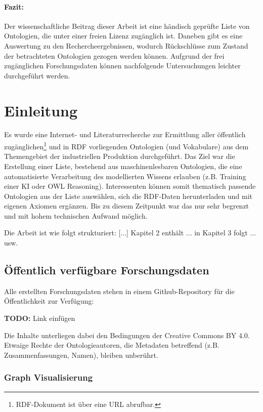 \documentclass{article}
\begin{document}
\paragraph{Fazit:} Der wissenschaftliche Beitrag dieser Arbeit ist eine händisch geprüfte Liste von Ontologien, die unter einer freien Lizenz zugänglich ist. Daneben gibt es eine Auswertung zu den Rechercheergebnissen, wodurch Rückschlüsse zum Zustand der betrachteten Ontologien gezogen werden können. Aufgrund der frei zugänglichen Forschungsdaten können nachfolgende Untersuchungen leichter durchgeführt werden.

\newpage

\section{Einleitung}

Es wurde eine Internet- und Literaturrecherche zur Ermittlung aller öffentlich zugänglichen\footnote{RDF-Dokument ist über eine URL abrufbar.} und in RDF vorliegenden Ontologien (und Vokabulare) aus dem Themengebiet der industriellen Produktion durchgeführt.
Das Ziel war die Erstellung einer Liste, bestehend aus maschinenlesbaren Ontologien, die eine automatisierte Verarbeitung des modellierten Wissens erlauben (z.B. Training einer KI oder OWL Reasoning).
Interessenten können somit thematisch passende Ontologien aus der Liste auswählen, sich die RDF-Daten herunterladen und mit eigenen Axiomen ergänzen.
Bis zu diesem Zeitpunkt war das nur sehr begrenzt und mit hohem technischen Aufwand möglich.

Die Arbeit ist wie folgt strukturiert: [...] Kapitel 2 enthält ... in Kapitel 3 folgt ... usw.

\subsection{Öffentlich verfügbare Forschungsdaten}

Alle erstellten Forschungsdaten stehen in einem Github-Repository für die Öffentlichkeit zur Verfügung:

\textbf{TODO:} Link einfügen

Die Inhalte unterliegen dabei den Bedingungen der Creative Commons BY 4.0.
Etwaige Rechte der Ontologieautoren, die Metadaten betreffend (z.B. Zusammenfassungen, Namen), bleiben unberührt.

\subsubsection{Graph Visualisierung}
\end{document}
